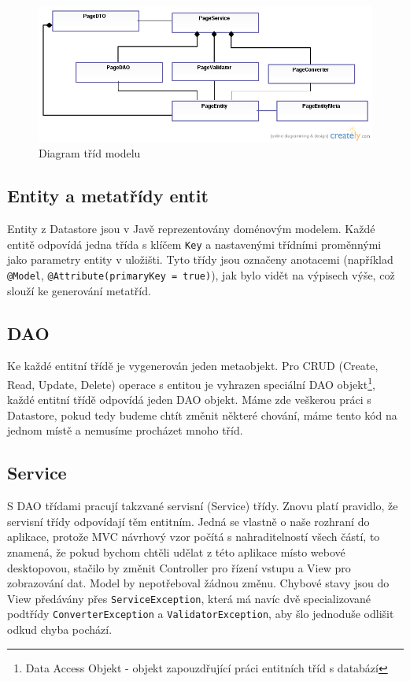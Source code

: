 \begin{figure}[h]
\begin{center}
\includegraphics[width=5in]{figures/cms-uml.png}
\caption{Diagram tříd modelu}
\label{fig:modelUml}
\end{center}
\end{figure}

\subsection{Entity a metatřídy entit}
Entity z Datastore jsou v Javě reprezentovány doménovým modelem. Každé entitě odpovídá jedna třída s klíčem \verb|Key| a nastavenými třídními proměnnými jako parametry entity v uložišti. Tyto třídy jsou označeny anotacemi (například \verb|@Model|, \verb|@Attribute(primaryKey = true)|), jak bylo vidět na výpisech výše, což slouží ke generování metatříd. 

\subsection{DAO}
Ke každé entitní třídě je vygenerován jeden metaobjekt. Pro CRUD (Create, Read, Update, Delete) operace s entitou je vyhrazen speciální DAO objekt\footnote{Data Access Objekt - objekt zapouzdřující práci entitních tříd s databází}, každé entitní třídě odpovídá jeden DAO objekt. Máme zde veškerou práci s Datastore, pokud tedy budeme chtít změnit některé chování, máme tento kód na jednom místě a nemusíme procházet mnoho tříd. 

\subsection{Service}
S DAO třídami pracují takzvané servisní (Service) třídy. Znovu platí pravidlo, že servisní třídy odpovídají těm entitním. Jedná se vlastně o naše rozhraní do aplikace, protože MVC návrhový vzor počítá s nahraditelností všech částí, to znamená, že pokud bychom chtěli udělat z této aplikace místo webové desktopovou, stačilo by změnit Controller pro řízení vstupu a View pro zobrazování dat. Model by nepotřeboval žádnou změnu. Chybové stavy jsou do View předávány přes \verb|ServiceException|, která má navíc dvě specializované podtřídy \verb|ConverterException| a \verb|ValidatorException|, aby šlo jednoduše odlišit odkud chyba pochází. 

